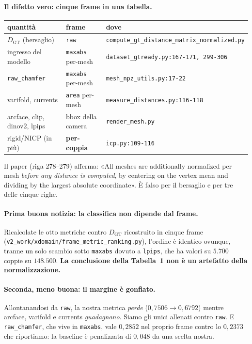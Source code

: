 \documentclass[11pt,a4paper]{article}
\begin{document}
\paragraph{Il difetto vero: cinque frame in una tabella.}

\begin{center}\small
\begin{tabular}{lll}
\toprule
quantit\`a & frame & dove \\
\midrule
$D_{\mathrm{GT}}$ (bersaglio) & \texttt{raw} & \texttt{compute\_gt\_distance\_matrix\_normalized.py} \\
ingresso del modello & \texttt{maxabs} per-mesh & \texttt{dataset\_gtready.py:167-171, 299-306} \\
\texttt{raw\_chamfer} & \texttt{maxabs} per-mesh & \texttt{mesh\_npz\_utils.py:17-22} \\
varifold, currents & \texttt{area} per-mesh & \texttt{measure\_distances.py:116-118} \\
arcface, clip, dinov2, lpips & bbox della camera & \texttt{render\_mesh.py} \\
rigid/NICP (in pi\`u) & \textbf{per-coppia} & \texttt{icp.py:109-116} \\
\bottomrule
\end{tabular}
\end{center}

Il paper (riga 278--279) afferma: «All meshes are additionally normalized per mesh \emph{before
any distance is computed}, by centering on the vertex mean and dividing by the largest absolute
coordinate». \`E falso per il bersaglio e per tre delle cinque righe.

\paragraph{Prima buona notizia: la classifica non dipende dal frame.} Ricalcolate le otto
metriche contro $D_{\mathrm{GT}}$ ricostruito in cinque frame
(\texttt{v2\_work/xdomain/frame\_metric\_ranking.py}), l'ordine \`e identico ovunque, tranne un
solo scambio sotto \texttt{maxabs} dovuto a \texttt{lpips}, che ha valori su $5{.}700$ coppie
su $148{.}500$. \textbf{La conclusione della Tabella~1 non \`e un artefatto della
normalizzazione.}

\paragraph{Seconda, meno buona: il margine \`e gonfiato.} Allontanandosi da \texttt{raw}, la
nostra metrica \emph{perde} ($0{,}7506 \to 0{,}6792$) mentre arcface, varifold e currents
\emph{guadagnano}. Siamo gli unici allenati contro \texttt{raw}. E \texttt{raw\_chamfer}, che
vive in \texttt{maxabs}, vale $0{,}2852$ nel proprio frame contro lo $0{,}2373$ che riportiamo:
la baseline \`e penalizzata di $0{,}048$ da una scelta nostra.
\end{document}
